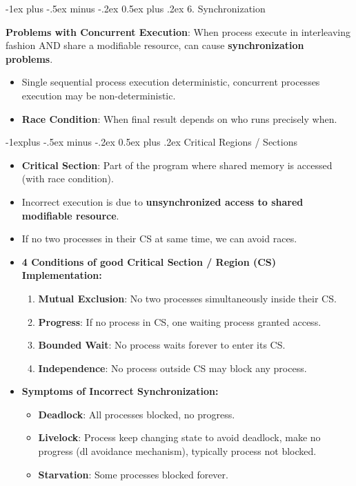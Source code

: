 \documentclass[10pt, landscape]{article}
\makeatletter
\renewcommand{\section}{\@startsection{section}{1}{0mm}%
                                {-1ex plus -.5ex minus -.2ex}%
                                {0.5ex plus .2ex}%
                                {\normalfont\large\bfseries}}
\renewcommand{\subsection}{\@startsection{subsection}{2}{0mm}%
                                {-1explus -.5ex minus -.2ex}%
                                {0.5ex plus .2ex}%
                                {\normalfont\normalsize\bfseries}}
\makeatother
\begin{document}
\begin{multicols*}{3}
\vfill \null
\columnbreak


\section{6. Synchronization}

\textbf{Problems with Concurrent Execution}: When process execute in interleaving fashion AND share a modifiable resource, can cause \textbf{synchronization problems}. 
\begin{itemize}
\item Single sequential process execution deterministic, concurrent processes execution may be non-deterministic.
\item \textbf{Race Condition}: When final result depends on who runs precisely when. 
\end{itemize}

\subsection{Critical Regions / Sections}
\begin{itemize}
\item \textbf{Critical Section}: Part of the program where shared memory is accessed (with race condition).
\item Incorrect execution is due to \textbf{unsynchronized access to shared modifiable resource}.
\item If no two processes in their CS at same time, we can avoid races.
\item \textbf{4 Conditions of good Critical Section / Region (CS) Implementation:}
	\begin{enumerate}
	\item \textbf{Mutual Exclusion}: No two processes simultaneously inside their CS.
	\item \textbf{Progress}: If no process in CS, one waiting process granted access.
	\item \textbf{Bounded Wait}: No process waits forever to enter its CS.
	\item \textbf{Independence}: No process outside CS may block any process.
	\end{enumerate}
\item \textbf{Symptoms of Incorrect Synchronization:}
	\begin{itemize}
	\item \textbf{Deadlock}: All processes blocked, no progress.
	\item \textbf{Livelock}: Process keep changing state to avoid deadlock, make no progress (dl avoidance mechanism), typically process not blocked.
	\item \textbf{Starvation}: Some processes blocked forever.
	\end{itemize}
\end{itemize}


\end{multicols*}
\end{document}
